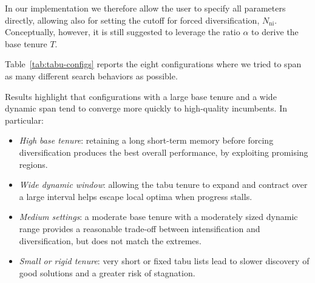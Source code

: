 In our implementation we therefore allow the user to specify all parameters directly, allowing also for setting the cutoff for forced diversification, \(N_{\mathrm{ni}}\). Conceptually, however, it is still suggested to leverage the ratio \(\alpha\) to derive the base tenure \(T\).

Table~\ref{tab:tabu-configs} reports the eight configurations where we tried to span as many different search behaviors as possible.

\begin{table}[h]
  \centering
  \caption{Tabu Search configurations and rationale}
  \label{tab:tabu-configs}
\end{table}

Results highlight that configurations with a large base tenure and a wide dynamic span tend to converge more quickly to high-quality incumbents. In particular:
\begin{itemize}
  \item \emph{High base tenure}: retaining a long short-term memory before forcing diversification produces the best overall performance, by exploiting promising regions.
  \item \emph{Wide dynamic window}: allowing the tabu tenure to expand and contract over a large interval helps escape local optima when progress stalls.
  \item \emph{Medium settings}: a moderate base tenure with a moderately sized dynamic range provides a reasonable trade-off between intensification and diversification, but does not match the extremes.
  \item \emph{Small or rigid tenure}: very short or fixed tabu lists lead to slower discovery of good solutions and a greater risk of stagnation.
\end{itemize}

